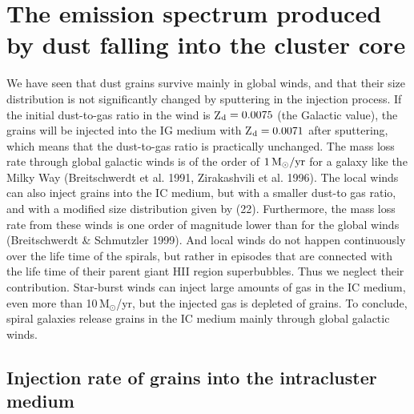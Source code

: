 \documentclass[]{aa}
\begin{document}
\section{The emission spectrum produced by dust falling into
the cluster core}


We have seen that dust grains survive mainly in global winds, and that their 
size distribution is not significantly changed by sputtering in the 
injection process. If the initial 
dust-to-gas ratio in the wind is Z$_{\rm d}=0.0075$ (the Galactic value), the 
grains will be injected into
the IG medium with Z$_{\rm d}=0.0071$ after sputtering, which means that the 
dust-to-gas
ratio is practically unchanged. The mass loss rate through global galactic
winds is 
of the order of $1\,{\rm M}_{\odot}/{\rm yr}$ for a galaxy like the Milky Way
(Breitschwerdt et al. 1991, Zirakashvili et al. 1996). The 
local winds can also inject 
grains into the IC medium, but with a smaller dust-to gas ratio, and with a 
modified size distribution given by (22). Furthermore, the mass loss
rate from these winds is one order of magnitude lower than for the global 
winds (Breitschwerdt \& Schmutzler 1999). And local winds do not happen
continuously over the life time of the spirals, but rather in episodes that are
connected with the life time of their parent giant HII region superbubbles. 
Thus we neglect
their contribution. Star-burst winds can inject
large amounts of gas in the IC medium, even more than 10\,M$_{\odot}$/yr, but
the injected gas is depleted of grains.
To conclude, spiral galaxies release grains in the IC medium mainly through
global galactic winds.


\subsection{Injection rate of grains into the intracluster medium}
\end{document}
